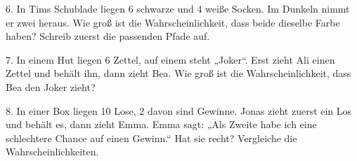 \documentclass[11pt]{article}
\begin{document}
\begin{pfaufg}{}{6.}{}
In Tims Schublade liegen 6 schwarze und 4 weiße Socken. Im Dunkeln nimmt er zwei heraus. Wie groß ist die Wahrscheinlichkeit, dass beide dieselbe Farbe haben? Schreib zuerst die passenden Pfade auf.
\end{pfaufg}

\begin{pfaufg}{}{7.}{}
In einem Hut liegen 6 Zettel, auf einem steht „Joker“. Erst zieht Ali einen Zettel und behält ihn, dann zieht Bea. Wie groß ist die Wahrscheinlichkeit, dass Bea den Joker zieht?
\end{pfaufg}

\begin{pfaufg}{}{8.}{}
In einer Box liegen 10 Lose, 2 davon sind Gewinne. Jonas zieht zuerst ein Los und behält es, dann zieht Emma. Emma sagt: „Als Zweite habe ich eine schlechtere Chance auf einen Gewinn.“ Hat sie recht? Vergleiche die Wahrscheinlichkeiten.
\end{pfaufg}
\end{document}
